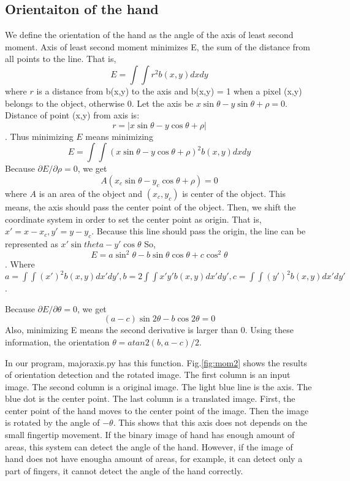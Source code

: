 \subsection{Orientaiton of the hand}
We define the orientation of the hand as the angle of the axis of least second moment.
Axis of least second moment minimizes E, the sum of the distance from all points to the line. That is,
$$E = \int \int r^2 b(x,y) dxdy$$
where $r$ is a distance from b(x,y) to the axis and b(x,y) = 1 when a pixel (x,y) belongs to the object, otherwise 0.
Let the axis be $x\sin{\theta} - y\sin{\theta} + \rho = 0$.
Distance of point (x,y) from axis is:
$$r = |x\sin{\theta}-y\cos{\theta}+\rho|$$.
Thus minimizing $E$ means minimizing
$$E = \int\int (x\sin{\theta}-y\cos{\theta}+\rho)^2 b(x,y)dxdy$$
Because $\partial E / \partial \rho = 0$, we get
$$A(x_c \sin{\theta} - y_c \cos{\theta} + \rho) = 0$$
where $A$ is an area of the object and $(x_c,y_c)$ is center of the object.
This means, the axis should pass the center point of the object.
Then, we shift the coordinate system in order to set the center point as origin.
That is, 
$x'= x - x_c, y' = y - y_c$.
Because this line should pass the origin, the line can be represented as
$x'\sin{theta}-y'\cos{\theta}$
So, $$E = a \sin^2{\theta} - b\sin{\theta}\cos{\theta} + c\cos^2{\theta}$$.
Where $a = \int\int (x')^2 b(x,y) dx'dy', b = 2\int\int x'y' b(x,y) dx'dy', 
c = \int\int (y')^2 b(x,y)dx'dy'$.\par
Because $\partial E / \partial \theta = 0$, we get
$$(a-c)\sin{2\theta} - b\cos{2\theta} = 0$$
Also, minimizing E means the second derivative is larger than 0.
Using these information, the orientation $\theta = atan2(b,a-c)/2$.\par
In our program, majoraxis.py has this function.
Fig.\ref{fig:mom2} shows the results of orientation detection and the rotated image.
The first column is an input image.
The second column is a original image. The light blue line is the axis. The blue dot is the center point.
The last column is a translated image. First, the center point of the hand moves to the center point of the image.
Then the image is rotated by the angle of $-\theta$.
This shows that this axis does not depends on the small fingertip movement.
If the binary image of hand has enough amount of areas, this system can detect the angle of the hand.
However, if the image of hand does not have enougha amount of areas, for example, it can detect only a part of fingers,
it cannot detect the angle of the hand correctly.

